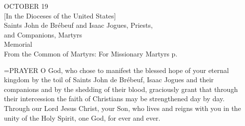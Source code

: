 \begin{center}\normalsize OCTOBER 19\\
\footnotesize [In the Dioceses of the United States]\\
\footnotesize Saints John de Brébeuf and Isaac Jogues, Priests,\\
\footnotesize and Companions, Martyrs\\
\footnotesize Memorial\\
\footnotesize From the Common of Martyrs: For Missionary Martyrs p.\\
\end{center}

\hangindent=\parindent \small{PRAYER 
O God, who chose to manifest
the blessed hope of your eternal kingdom
by the toil of Saints John de Brébeuf,
Isaac Jogues and their companions
and by the shedding of their blood,
graciously grant that through their intercession
the faith of Christians may be strengthened day by day.
Through our Lord Jesus Christ, your Son,
who lives and reigns with you in the unity of the Holy Spirit,
one God, for ever and ever.\\}
 
